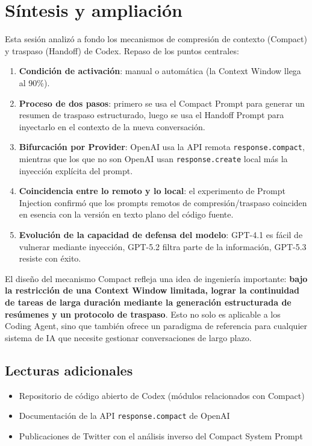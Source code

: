 \section{Síntesis y ampliación}

Esta sesión analizó a fondo los mecanismos de compresión de contexto (Compact) y traspaso (Handoff) de Codex. Repaso de los puntos centrales:

\begin{enumerate}
    \item \textbf{Condición de activación}: manual o automática (la Context Window llega al 90\%).
    \item \textbf{Proceso de dos pasos}: primero se usa el Compact Prompt para generar un resumen de traspaso estructurado, luego se usa el Handoff Prompt para inyectarlo en el contexto de la nueva conversación.
    \item \textbf{Bifurcación por Provider}: OpenAI usa la API remota \texttt{response.compact}, mientras que los que no son OpenAI usan \texttt{response.create} local más la inyección explícita del prompt.
    \item \textbf{Coincidencia entre lo remoto y lo local}: el experimento de Prompt Injection confirmó que los prompts remotos de compresión/traspaso coinciden en esencia con la versión en texto plano del código fuente.
    \item \textbf{Evolución de la capacidad de defensa del modelo}: GPT-4.1 es fácil de vulnerar mediante inyección, GPT-5.2 filtra parte de la información, GPT-5.3 resiste con éxito.
\end{enumerate}

El diseño del mecanismo Compact refleja una idea de ingeniería importante: \textbf{bajo la restricción de una Context Window limitada, lograr la continuidad de tareas de larga duración mediante la generación estructurada de resúmenes y un protocolo de traspaso}. Esto no solo es aplicable a los Coding Agent, sino que también ofrece un paradigma de referencia para cualquier sistema de IA que necesite gestionar conversaciones de largo plazo.

\subsection{Lecturas adicionales}

\begin{itemize}
    \item Repositorio de código abierto de Codex (módulos relacionados con Compact)
    \item Documentación de la API \texttt{response.compact} de OpenAI
    \item Publicaciones de Twitter con el análisis inverso del Compact System Prompt
\end{itemize}



